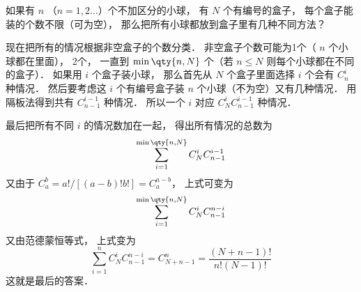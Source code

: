 

如果有 $n$ （$n=1,2\dots$）个不加区分的小球， 有 $N$ 个有编号的盒子， 每个盒子能装的个数不限（可为空）， 那么把所有小球都放到盒子里有几种不同方法？

现在把所有的情况根据非空盒子的个数分类． 非空盒子个数可能为1个（ $n$ 个小球都在里面）， 2个， 一直到 $\min\qty{n,N}$ 个（若 $n\leqslant N$ 则每个小球都在不同的盒子）． 如果用 $i$ 个盒子装小球， 那么首先从 $N$ 个盒子里面选择 $i$ 个会有 $C_n^i$ 种情况． 然后要考虑这 $i$ 个有编号盒子装 $n$ 个小球（不为空）又有几种情况． 用隔板法得到共有 $C_{n-1}^{i-1}$ 种情况． 所以一个 $i$ 对应 $C_N^i C_{n-1}^{i-1}$ 种情况．

最后把所有不同 $i$ 的情况数加在一起， 得出所有情况的总数为
\begin{equation}
\sum_{i = 1}^{\min\qty{n,N}} C_N^i C_{n-1}^{i-1}
\end{equation}
又由于 $C_a^b = a!/[(a-b)!b!] = C_a^{a-b}$， 上式可变为
\begin{equation}
\sum_{i=1}^{\min\qty{n,N}}  C_N^i C_{n-1}^{n-i}
\end{equation}
又由范德蒙恒等式， 上式变为
\begin{equation}
\sum_{i=1}^n C_N^i C_{n-1}^{n-i} = C_{N+n-1}^n = \frac{(N+n-1)!}{n!(N - 1)!}
\end{equation}
这就是最后的答案．
